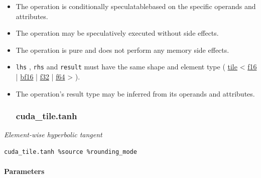 \documentclass{article}
\begin{document}
\begin{itemize}
\item The operation is conditionally speculatablebased on the specific operands and attributes.
\item The operation may be speculatively executed without side effects.
\item The operation is pure and does not perform any memory side effects.
\item \texttt{lhs} , \texttt{rhs} and \texttt{result} must have the same shape and element type ( \href{https://docs.nvidia.com/cuda/tile-ir/latest/sections/types.html#type-tile}{tile} < \href{https://docs.nvidia.com/cuda/tile-ir/latest/sections/types.html#subsection-element-types}{f16} | \href{https://docs.nvidia.com/cuda/tile-ir/latest/sections/types.html#subsection-element-types}{bf16} | \href{https://docs.nvidia.com/cuda/tile-ir/latest/sections/types.html#subsection-element-types}{f32} | \href{https://docs.nvidia.com/cuda/tile-ir/latest/sections/types.html#subsection-element-types}{f64} > ).
\item The operation's result type may be inferred from its operands and attributes.


\subsubsection{cuda\_tile.tanh}

\end{itemize}
\textit{Element-wise hyperbolic tangent}


\begin{lstlisting}
cuda_tile.tanh %source %rounding_mode
\end{lstlisting}

\paragraph{Parameters}
\end{document}
